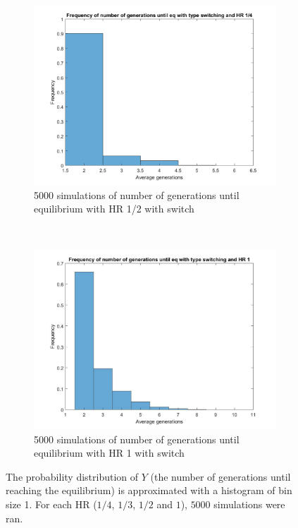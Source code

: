 \begin{figure}[H]
\begin{subfigure}{0.45\textwidth}
        \includegraphics[width=\textwidth]{AantGen3.pdf}
        \caption{5000 simulations of number of generations until equilibrium with HR 1/2 with switch}
        \label{hists hap 1/2}
    \end{subfigure}
    ~
    \begin{subfigure}{0.45\textwidth}
        \includegraphics[width=\textwidth]{AantGen4.pdf}
        \caption{5000 simulations of number of generations until equilibrium with HR 1 with switch}
        \label{hists hap 1}
    \end{subfigure}
    \caption{The probability distribution of $Y$ (the number of generations until reaching the equilibrium) is approximated with a histogram of bin size 1. 
    For each HR ($1/4$, $1/3$, $1/2$ and $1$), $5000$ simulations were ran.}
    \label{fig:histogramSw}
\end{figure}

